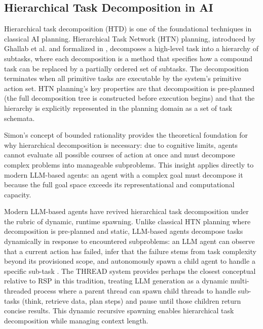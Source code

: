 \documentclass[12pt]{article}
\begin{document}
\subsection{Hierarchical Task Decomposition in AI}

Hierarchical task decomposition (HTD) is one of the foundational techniques in classical AI planning. Hierarchical Task Network (HTN) planning, introduced by Ghallab et al. \cite{ghallab2004htn} and formalized in \cite{erpl}, decomposes a high-level task into a hierarchy of subtasks, where each decomposition is a method that specifies how a compound task can be replaced by a partially ordered set of subtasks. The decomposition terminates when all primitive tasks are executable by the system's primitive action set. HTN planning's key properties are that decomposition is pre-planned (the full decomposition tree is constructed before execution begins) and that the hierarchy is explicitly represented in the planning domain as a set of task schemata.

Simon's concept of bounded rationality \cite{simon} provides the theoretical foundation for why hierarchical decomposition is necessary: due to cognitive limits, agents cannot evaluate all possible courses of action at once and must decompose complex problems into manageable subproblems. This insight applies directly to modern LLM-based agents: an agent with a complex goal must decompose it because the full goal space exceeds its representational and computational capacity.

Modern LLM-based agents have revived hierarchical task decomposition under the rubric of dynamic, runtime spawning. Unlike classical HTN planning where decomposition is pre-planned and static, LLM-based agents decompose tasks dynamically in response to encountered subproblems: an LLM agent can observe that a current action has failed, infer that the failure stems from task complexity beyond its provisioned scope, and autonomously spawn a child agent to handle a specific sub-task \cite{press2022,yao2022}. The THREAD system \cite{thread2025} provides perhaps the closest conceptual relative to RSP in this tradition, treating LLM generation as a dynamic multi-threaded process where a parent thread can spawn child threads to handle sub-tasks (think, retrieve data, plan steps) and pause until those children return concise results. This dynamic recursive spawning enables hierarchical task decomposition while managing context length.
\end{document}

